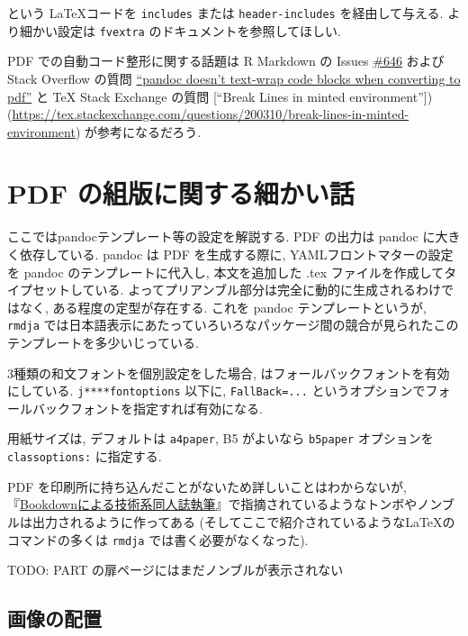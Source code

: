 \documentclass[
  xelatex,ja=standard,jafont=noto]{bxjsbook}
\theoremstyle{definition}
\theoremstyle{definition}
\theoremstyle{definition}
\theoremstyle{definition}
\theoremstyle{remark}
\begin{document}
という \LaTeX コードを \texttt{includes} または \texttt{header-includes}
を経由して与える. より細かい設定は \texttt{fvextra}
のドキュメントを参照してほしい.

PDF での自動コード整形に関する話題は R Markdown の Issues
\href{https://github.com/rstudio/rmarkdown/issues/646}{\#646} および
Stack Overflow の質問
\href{https://stackoverflow.com/questions/20788464/pandoc-doesnt-text-wrap-code-blocks-when-converting-to-pdf}{``pandoc
doesn't text-wrap code blocks when converting to pdf''} と TeX Stack
Exchange の質問 {[}``Break Lines in minted
environment''{]})(\url{https://tex.stackexchange.com/questions/200310/break-lines-in-minted-environment})
が参考になるだろう.

\hypertarget{pdf-ux306eux7d44ux7248ux306bux95a2ux3059ux308bux7d30ux304bux3044ux8a71}{%
\chapter{PDF
の組版に関する細かい話}\label{pdf-ux306eux7d44ux7248ux306bux95a2ux3059ux308bux7d30ux304bux3044ux8a71}}

ここではpandocテンプレート等の設定を解説する. PDF の出力は pandoc
に大きく依存している. pandoc は PDF を生成する際に,
YAMLフロントマターの設定を pandoc のテンプレートに代入し, 本文を追加した
.tex ファイルを作成してタイプセットしている.
よってプリアンブル部分は完全に動的に生成されるわけではなく,
ある程度の定型が存在する. これを pandoc テンプレートというが,
\texttt{rmdja}
では日本語表示にあたっていろいろなパッケージ間の競合が見られたこのテンプレートを多少いじっている.

3種類の和文フォントを個別設定をした場合, \XeLaTeX
はフォールバックフォントを有効にしている. \texttt{j****fontoptions}
以下に, \texttt{FallBack=...}
というオプションでフォールバックフォントを指定すれば有効になる.

用紙サイズは, デフォルトは \texttt{a4paper}, B5 がよいなら
\texttt{b5paper} オプションを \texttt{classoptions:} に指定する.

PDF を印刷所に持ち込んだことがないため詳しいことはわからないが,
『\href{https://teastat.blogspot.com/2019/01/bookdown.html}{Bookdownによる技術系同人誌執筆}』で指摘されているようなトンボやノンブルは出力されるように作ってある
(そしてここで紹介されているようなLaTeXのコマンドの多くは \texttt{rmdja}
では書く必要がなくなった).

TODO: PART の扉ページにはまだノンブルが表示されない

\hypertarget{ux753bux50cfux306eux914dux7f6e}{%
\section{画像の配置}\label{ux753bux50cfux306eux914dux7f6e}}
\end{document}
